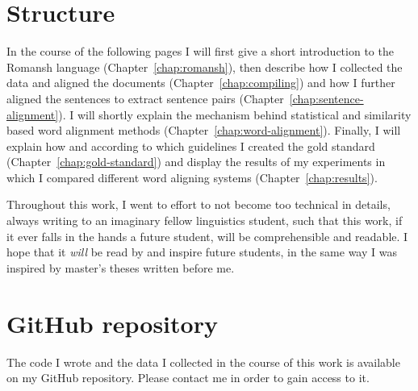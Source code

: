 \section{Structure}
In the course of the following pages I will first give a short introduction to the Romansh language (Chapter~\ref{chap:romansh}), then describe how I collected the data and aligned the documents (Chapter~\ref{chap:compiling}) and how I further aligned the sentences to extract sentence pairs (Chapter~\ref{chap:sentence-alignment}). 
I will shortly explain the mechanism behind statistical and similarity based word alignment methods (Chapter~\ref{chap:word-alignment}). 
Finally, I will explain how and according to which guidelines I created the gold standard (Chapter~\ref{chap:gold-standard}) and display the results of my experiments in which I compared different word aligning systems (Chapter~\ref{chap:results}).

Throughout this work, I went to effort to not become too technical in details, always writing to an imaginary fellow linguistics student, such that this work, if it ever falls in the hands a future student, will be comprehensible and readable. 
I hope that it \emph{will} be read by and inspire future students, in the same way I was inspired by master's theses written before me.

\section{GitHub repository}
The code I wrote and the data I collected in the course of this work is available on my GitHub repository. 
Please contact me in order to gain access to it.


